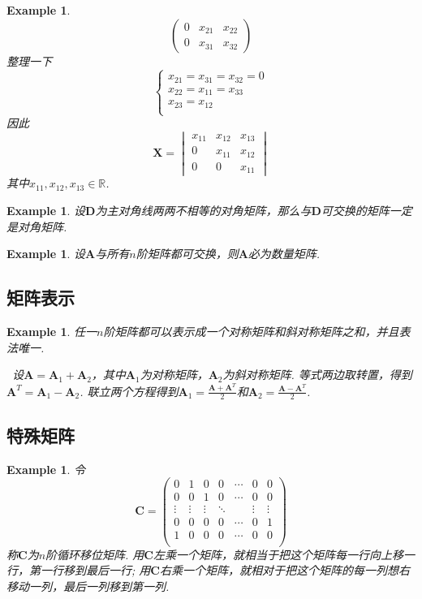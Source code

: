 \documentclass{article}
\newtheorem{example}[theorem]{Example}
\newcommand{\hints}{{\color{blue} \text{hints}}}
\newcommand{\mbf}[1]{\bm{#1}}
\begin{document}
\begin{example}
$$\begin{pmatrix}
0 & x_{21} & x_{22} \\
0 & x_{31} & x_{32}
\end{pmatrix}
$$
整理一下
$$
\left\{
\begin{array}{ll}
x_{21} = x_{31} = x_{32} = 0 \\
x_{22} = x_{11} = x_{33} \\
x_{23} = x_{12} \\
\end{array} \right.
$$
因此
$$
\mbf{X} = \begin{vmatrix}
x_{11} & x_{12} & x_{13} \\
0 & x_{11} & x_{12} \\
0 & 0 & x_{11}
\end{vmatrix}
$$
其中$x_{11},x_{12},x_{13} \in \mathbb{R}$. 
\end{example}

\begin{example}
\rm 设$\mbf{D}$为主对角线两两不相等的对角矩阵，那么与$\mbf{D}$可交换的矩阵一定是对角矩阵. 
\end{example}

\begin{example}
\rm 设$\mbf{A}$与所有$n$阶矩阵都可交换，则$\mbf{A}$必为数量矩阵. 
\end{example}

\subsection{矩阵表示}

\begin{example}
\rm 任一$n$阶矩阵都可以表示成一个对称矩阵和斜对称矩阵之和，并且表法唯一.

\hints\ 设$\mbf{A} = \mbf{A}_1 + \mbf{A}_2$，其中$\mbf{A}_1$为对称矩阵，$\mbf{A}_2$为斜对称矩阵. 等式两边取转置，得到$\mbf{A}^T = \mbf{A}_1 - \mbf{A}_2$. 联立两个方程得到$\mbf{A}_1 = \frac{\mbf{A} + \mbf{A}^T}{2}$和$\mbf{A}_2 = \frac{\mbf{A} - \mbf{A}^T}{2}$. 
\end{example}

\subsection{特殊矩阵}

\begin{example}
\rm 令
$$
\mbf{C} = \begin{pmatrix}
0 & 1 & 0 & 0 & \cdots & 0 & 0 \\
0 & 0 & 1 & 0 & \cdots & 0 & 0 \\
\vdots & \vdots & \vdots &  \ddots &  & \vdots & \vdots \\
0 & 0 & 0 & 0 & \cdots & 0 & 1 \\
1 & 0 & 0 & 0 & \cdots & 0 & 0 \\
\end{pmatrix}
$$
称$\mbf{C}$为$n$阶循环移位矩阵. 用$\mbf{C}$左乘一个矩阵，就相当于把这个矩阵每一行向上移一行，第一行移到最后一行; 用$\mbf{C}$右乘一个矩阵，就相对于把这个矩阵的每一列想右移动一列，最后一列移到第一列. 
\end{example}
\end{document}
